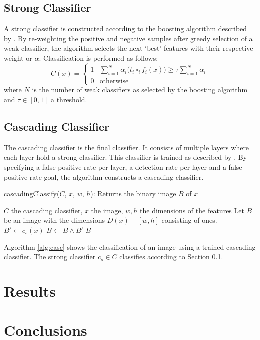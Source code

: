 \documentclass[a4paper,11pt]{article}
\begin{document}
\subsection{Strong Classifier} \label{sec:strong}
A strong classifier is constructed according to the boosting algorithm
described by \cite{viola}. By re-weighting the positive and negative samples
after greedy selection of a weak classifier, the algorithm selects the next
`best' features with their respective weight or $\alpha$. Classification is
performed as follows:
\begin{displaymath}
C(x) = 
	\left\{ \begin{array}{ll}
		1 & \sum^N_{i=1} \alpha_i \big(t_i \circ_i f_i(x)\big) \ge \tau \sum^N_{i=1}\alpha_i \\
		0 & \textrm{otherwise}
	\end{array} \right.
\end{displaymath}
where $N$ is the number of weak classifiers as selected by the boosting
algorithm and $\tau \in [0,1]$ a threshold.

\subsection{Cascading Classifier} \label{sec:casc}
The cascading classifier is the final classifier. It consists of multiple
layers where each layer hold a strong classifier. This classifier is trained as
described by \cite{viola}. By specifying a false positive rate per layer, a
detection rate per layer and a false positive rate goal, the algorithm
constructs a cascading classifier.
\begin{algorithm}
	\caption{cascadingClassify($C$, $x$, $w$, $h$): Returns the binary image $B$ of $x$}
	\begin{algorithmic}[1]
	\REQUIRE $C$ the cascading classifier, $x$ the image, $w,h$ the dimensions of the features
	\medskip
	\STATE Let $B$ be an image with the dimensions $D(x) - [w,h]$ consisting of ones.
		\STATE $B' \leftarrow c_s(x)$
		\STATE $B \leftarrow B \land B'$
	\ENDFOR
	\RETURN $B$
	\end{algorithmic}
\label{alg:casc}
\end{algorithm}
Algorithm \ref{alg:casc} shows the classification of an image using a trained
cascading classifier. The strong classifier $c_s \in C$ classifies according to
Section \ref{sec:strong}.

\section{Results} \label{sec:res}

\section{Conclusions} \label{sec:conc}

\renewcommand\bibname{References}


\end{document}
